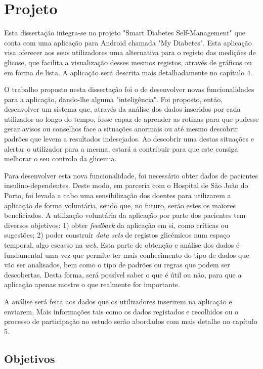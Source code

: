 \section{Projeto}


Esta dissertação integra-se no projeto "Smart Diabetes Self-Management" que conta com uma aplicação para Android chamada "My Diabetes". Esta aplicação visa oferecer aos seus utilizadores uma alternativa para o registo das medições de glicose, que facilita a visualização desses mesmos registos, através de gráficos ou em forma de lista. A aplicação será descrita mais detalhadamente no capítulo 4. 

O trabalho proposto nesta dissertação foi o de desenvolver novas funcionalidades para a aplicação, dando-lhe alguma "inteligência". Foi proposto, então, desenvolver um sistema que, através da análise dos dados inseridos por cada utilizador ao longo do tempo, fosse capaz de aprender as rotinas para que pudesse gerar avisos ou conselhos face a situações anormais ou até mesmo descobrir padrões que levem a resultados indesejados. Ao descobrir uma destas situações e alertar o utilizador para a mesma, estará a contribuir para que este consiga melhorar o seu controlo da glicemia.

Para desenvolver esta nova funcionalidade, foi necessário obter dados de pacientes insulino-dependentes. Deste modo, em parceria com o Hospital de São João do Porto, foi levada a cabo uma sensibilização dos doentes para utilizarem a aplicação de forma voluntária, sendo que, no futuro, serão estes os maiores beneficiados.
A utilização voluntária da aplicação por parte dos pacientes tem diversos objetivos: 1) obter \textit{feedback} da aplicação em si, como críticas ou sugestões; 2) poder construir \textit{data sets} de registos glicémicos num espaço temporal, algo escasso na \textit{web}. Esta parte de obtenção e análise dos dados é fundamental uma vez que permite ter mais conhecimento do tipo de dados que vão ser analisados, bem como o tipo de padrões ou regras que podem ser descobertas. Desta forma, será possível saber o que é útil ou não, para que a aplicação apenas mostre o que realmente for importante. 

A análise será feita aos dados que os utilizadores inserirem na aplicação e enviarem. Mais informações tais como os dados registados e recolhidos ou o processo de participação no estudo serão abordados com mais detalhe no capítulo 5.


\subsection{Objetivos}

